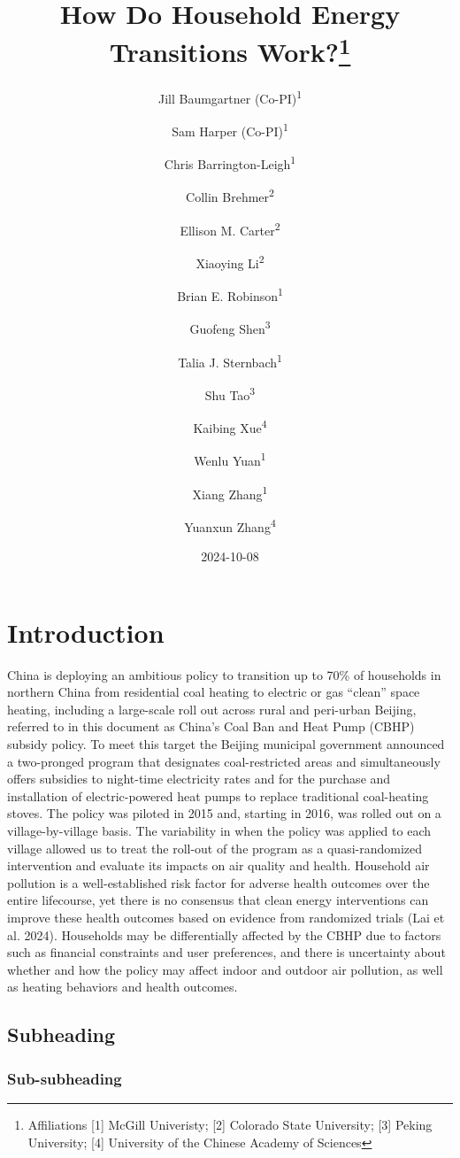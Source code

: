\documentclass[
  letterpaper,
  DIV=11,
  numbers=noendperiod]{scrartcl}
\title{How Do Household Energy Transitions Work?\thanks{Affiliations
{[}1{]} McGill Univeristy; {[}2{]} Colorado State University; {[}3{]}
Peking University; {[}4{]} University of the Chinese Academy of
Sciences}}
\author{Jill Baumgartner (Co-PI)\textsuperscript{1} \and Sam Harper
(Co-PI)\textsuperscript{1} \and Chris
Barrington-Leigh\textsuperscript{1} \and Collin
Brehmer\textsuperscript{2} \and Ellison M.
Carter\textsuperscript{2} \and Xiaoying Li\textsuperscript{2} \and Brian
E. Robinson\textsuperscript{1} \and Guofeng
Shen\textsuperscript{3} \and Talia J.
Sternbach\textsuperscript{1} \and Shu
Tao\textsuperscript{3} \and Kaibing Xue\textsuperscript{4} \and Wenlu
Yuan\textsuperscript{1} \and Xiang Zhang\textsuperscript{1} \and Yuanxun
Zhang\textsuperscript{4}}
\date{2024-10-08}
\renewcommand*\contentsname{Table of contents}
\newcommand\contentsname{Table of contents}
\begin{document}
\maketitle

\renewcommand*\contentsname{Table of contents}
{
\hypersetup{linkcolor=}
\setcounter{tocdepth}{3}
\tableofcontents
}

\newpage

\section{Introduction}\label{introduction}

China is deploying an ambitious policy to transition up to 70\% of
households in northern China from residential coal heating to electric
or gas ``clean'' space heating, including a large-scale roll out across
rural and peri-urban Beijing, referred to in this document as China's
Coal Ban and Heat Pump (CBHP) subsidy policy. To meet this target the
Beijing municipal government announced a two-pronged program that
designates coal-restricted areas and simultaneously offers subsidies to
night-time electricity rates and for the purchase and installation of
electric-powered heat pumps to replace traditional coal-heating stoves.
The policy was piloted in 2015 and, starting in 2016, was rolled out on
a village-by-village basis. The variability in when the policy was
applied to each village allowed us to treat the roll-out of the program
as a quasi-randomized intervention and evaluate its impacts on air
quality and health. Household air pollution is a well-established risk
factor for adverse health outcomes over the entire lifecourse, yet there
is no consensus that clean energy interventions can improve these health
outcomes based on evidence from randomized trials (Lai et al. 2024).
Households may be differentially affected by the CBHP due to factors
such as financial constraints and user preferences, and there is
uncertainty about whether and how the policy may affect indoor and
outdoor air pollution, as well as heating behaviors and health outcomes.

\subsection{Subheading}\label{subheading}

\subsubsection{Sub-subheading}\label{sub-subheading}
\end{document}
